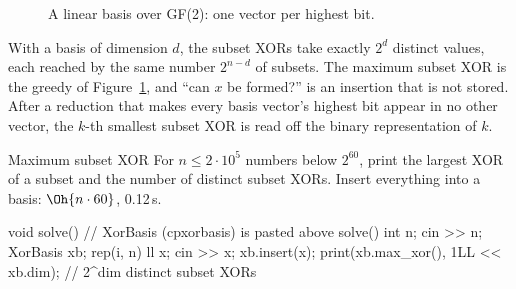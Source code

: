 \begin{figure}[htbp]
\centering
{}
\caption{A linear basis over GF(2): one vector per highest bit.}
\label{fig:xorbasis}
\end{figure}

With a basis of dimension $d$, the subset XORs take exactly $2^d$ distinct values, each reached by the same number $2^{n - d}$ of
subsets. The maximum subset XOR is the greedy of Figure~\ref{fig:xorbasis}, and ``can $x$ be formed?'' is an insertion that is not
stored. After a reduction that makes every basis vector's highest bit appear in no other vector, the $k$-th smallest subset XOR is
read off the binary representation of $k$.


\begin{problem}{Maximum subset XOR}
For $n \le 2 \cdot 10^5$ numbers below $2^{60}$, print the largest XOR of a subset and the number of distinct subset XORs.
\solution Insert everything into a basis: $\Oh{n \cdot 60}$, 0.12\,s.
\end{problem}

\begin{code}
void solve() {  // XorBasis (cpxorbasis) is pasted above solve()
    int n;
    cin >> n;
    XorBasis xb;
    rep(i, n) {
        ll x;
        cin >> x;
        xb.insert(x);
    }
    print(xb.max_xor(), 1LL << xb.dim);  // 2^dim distinct subset XORs
}
\end{code}

